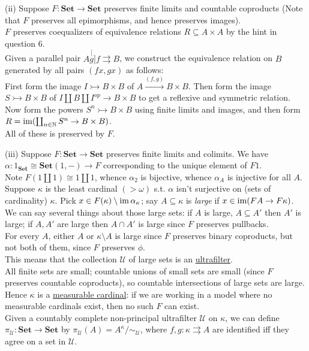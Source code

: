 \documentclass[a4paper]{article}
\begin{document}
(ii) Suppose $F:\mathbf{Set} \to \mathbf{Set}$ preserves finite limits and countable coproducts (Note that $F$ preserves all epimorphisms, and hence preserves images).\\
$F$ preserves coequalizers of equivalence relations $R \subseteq A \times A$ by the hint in question 6.\\
Given a parallel pair $A \stackrel[g]{f}{\rightrightarrows} B$, we construct the equivalence relation on $B$ generated by all pairs $(fx,gx)$ as follows:\\
First form the image $I \rightarrowtail B \times B$ of $A \xrightarrow{(f,g)} B \times B$. Then form the image $S \rightarrowtail B \times B$ of $I \coprod B \coprod I^{op} \to B \times B$ to get a reflexive and symmetric relation. Now form the powers $S^n \rightarrowtail B \times B$ using finite limits and images, and then form $R = \operatorname{im}(\coprod_{n \in \mathbb{N}} S^n \to B \times B)$.\\
All of these is preserved by $F$.

(iii) Suppose $F:\mathbf{Set} \to \mathbf{Set}$ preserves finite limits and colimits. We have $\alpha:1_{\mathbf{Set}} \cong \mathbf{Set}(1,-) \to F$ corresponding to the unique element of $F1$.\\
Note $F(1 \coprod 1) \cong 1 \coprod 1$, whence $\alpha_2$ is bijective, whence $\alpha_A$ is injective for all $A$.\\
Suppose $\kappa$ is the least cardinal $(>\omega)$ s.t. $\alpha$ isn't surjective on (sets of cardinality) $\kappa$. Pick $x \in F(\kappa) \setminus \operatorname{im} \alpha_\kappa$; say $A \subseteq \kappa$ is \emph{large} if $x \in \operatorname{im}(FA \to F\kappa)$.\\
We can say several things about those large sets: if $A$ is large, $A \subseteq A'$ then $A'$ is large; if $A,A'$ are large then $A \cap A'$ is large since $F$ preserves pullbacks.\\
For every $A$, either $A$ or $\kappa \setminus A$ is large since $F$ preserves binary coproducts, but not both of them, since $F$ preserves $\phi$.\\
This means that the collection $\mathcal{U}$ of large sets is an \href{https://en.wikipedia.org/wiki/Ultrafilter}{ultrafilter}.\\
All finite sets are small; countable unions of small sets are small (since $F$ preserves countable coproducts), so countable intersections of large sets are large.\\
Hence $\kappa$ is a \href{https://en.wikipedia.org/wiki/Measurable_cardinal}{measurable cardinal}: if we are working in a model where no measurable cardinals exist, then no such $F$ can exist.\\
Given a countably complete non-principal ultrafilter $\mathcal{U}$ on $\kappa$, we can define $\pi_\mathcal{U}: \mathbf{Set} \to \mathbf{Set}$ by $\pi_\mathcal{U} (A) = A^\kappa / \sim_\mathcal{U}$, where $f,g: \kappa \rightrightarrows A$ are identified iff they agree on a set in $\mathcal{U}$.
\end{document}
